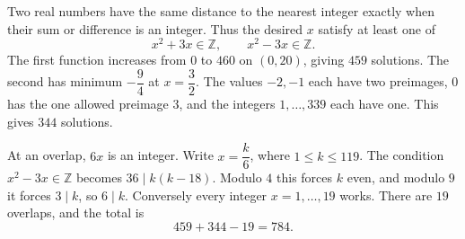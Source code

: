 Two real numbers have the same distance to the nearest integer exactly when their sum or difference is an integer. Thus the desired $x$ satisfy at least one of
\[
x^2+3x\in\mathbb Z,\qquad x^2-3x\in\mathbb Z.
\]
The first function increases from $0$ to $460$ on $(0,20)$, giving $459$ solutions. The second has minimum $-\dfrac{9}{4}$ at $x=\dfrac{3}{2}$. The values $-2,-1$ each have two preimages, $0$ has the one allowed preimage $3$, and the integers $1,\ldots,339$ each have one. This gives $344$ solutions.

At an overlap, $6x$ is an integer. Write $x=\dfrac{k}{6}$, where $1\le k\le119$. The condition $x^2-3x\in\mathbb Z$ becomes $36\mid k(k-18)$. Modulo $4$ this forces $k$ even, and modulo $9$ it forces $3\mid k$, so $6\mid k$. Conversely every integer $x=1,\ldots,19$ works. There are $19$ overlaps, and the total is
\[
\boxed{459+344-19=784}.
\]
